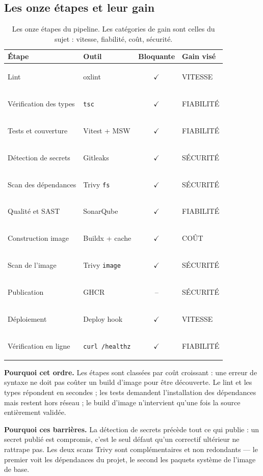 \documentclass[11pt,a4paper]{article}
\newcommand{\pastille}[2]{%
  \colorbox{#1}{\color{white}\scriptsize\bfseries\strut #2}}
\newcommand{\gVitesse}{\pastille{bleuFonce}{VITESSE}}
\newcommand{\gFiabilite}{\pastille{vertOk}{FIABILITÉ}}
\newcommand{\gSecurite}{\pastille{rougeAlerte}{SÉCURITÉ}}
\newcommand{\gCout}{\pastille{orangeAcc}{COÛT}}
\newcommand{\bloque}{\textcolor{rougeAlerte}{$\checkmark$}}
\newcommand{\nonbloque}{\textcolor{grisFonce}{--}}
\begin{document}
\subsection{Les onze étapes et leur gain}

\begin{table}[htbp]
\centering
\small
\begin{tabular}{@{}l l c l@{}}
\toprule
\textbf{Étape} & \textbf{Outil} & \textbf{Bloquante} & \textbf{Gain visé} \\
\midrule
Lint                 & oxlint              & \bloque    & \gVitesse   \\
Vérification des types & \texttt{tsc}      & \bloque    & \gFiabilite \\
Tests et couverture  & Vitest + MSW        & \bloque    & \gFiabilite \\
Détection de secrets & Gitleaks            & \bloque    & \gSecurite  \\
Scan des dépendances & Trivy \texttt{fs}   & \bloque    & \gSecurite  \\
Qualité et SAST      & SonarQube           & \bloque    & \gFiabilite \\
Construction image   & Buildx + cache      & \bloque    & \gCout      \\
Scan de l'image      & Trivy \texttt{image} & \bloque   & \gSecurite  \\
Publication          & GHCR                & \nonbloque & \gSecurite  \\
Déploiement          & Deploy hook         & \bloque    & \gVitesse   \\
Vérification en ligne & \texttt{curl /healthz} & \bloque & \gFiabilite \\
\bottomrule
\end{tabular}
\caption{Les onze étapes du pipeline. Les catégories de gain sont celles du
sujet : vitesse, fiabilité, coût, sécurité.}
\label{tab:etapes}
\end{table}

\textbf{Pourquoi cet ordre.} Les étapes sont classées par coût croissant :
une erreur de syntaxe ne doit pas coûter un build d'image pour être
découverte. Le lint et les types répondent en secondes ; les tests demandent
l'installation des dépendances mais restent hors réseau ; le build d'image
n'intervient qu'une fois la source entièrement validée.

\textbf{Pourquoi ces barrières.} La détection de secrets précède tout ce qui
publie : un secret publié est compromis, c'est le seul défaut qu'un
correctif ultérieur ne rattrape pas. Les deux scans Trivy sont
complémentaires et non redondants — le premier voit les dépendances du
projet, le second les paquets système de l'image de base.
\end{document}
